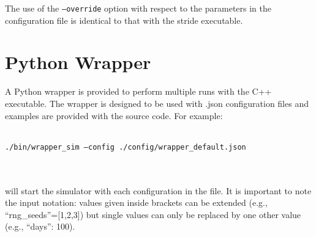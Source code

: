 The use of the \texttt{--override} option with respect to the parameters in the configuration file is identical to
that with the stride executable.

\section{Python Wrapper}
A Python wrapper is provided to perform multiple runs with the C++ executable.
The wrapper is designed to be used with .json configuration files and examples are provided with the source code.
For example: \\ \\
\centerline{\texttt{./bin/wrapper\_sim --config ./config/wrapper\_default.json}} \\ \\
will start the simulator with each configuration in the file.
It is important to note the input notation: values given inside brackets can be extended (e.g., ``rng\_seeds''=[1,2,3]) but single values can only be replaced by one other value (e.g., ``days'': 100).


